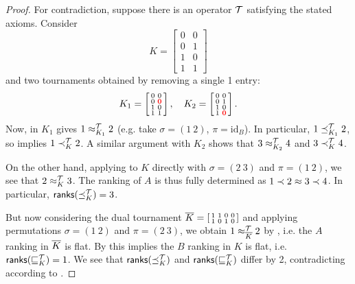 \begin{proof}

    For contradiction, suppose there is an operator $\mathcal{T}$ satisfying the
    stated axioms. Consider
    \[
        K = \left[\begin{smallmatrix}
            0 & 0 \\
            0 & 1 \\
            1 & 0 \\
            1 & 1
        \end{smallmatrix}\right]
    \]
    and two tournaments obtained by removing a single 1 entry:
    \[
        K_1 = \left[\begin{smallmatrix}
            0 & 0 \\
            0 & \bm{{\color{red}0}} \\
            1 & 0 \\
            1 & 1
        \end{smallmatrix}\right],
        \quad
        K_2 = \left[\begin{smallmatrix}
            0 & 0 \\
            0 & 1 \\
            1 & 0 \\
            1 & \bm{{\color{red}0}}
        \end{smallmatrix}\right].
    \]
    Now, \anon{} in $K_1$ gives $1 \approx_{K_1}^{\mathcal{T}} 2$ (e.g. take
    $\sigma = (1\ 2)$, $\pi = \text{id}_B$). In particular, $1 \preceq_{K_1}^{\mathcal{T}}
    2$, so \posresp{} implies $1 \prec_K^{\mathcal{T}} 2$. A similar argument
    with $K_2$ shows that $3 \approx_{K_2}^{\mathcal{T}} 4$ and $3 \prec_K^{\mathcal{T}} 4$.

    On the other hand, applying \anon{} to $K$ directly with $\sigma =
    (2\ 3)$ and $\pi = (1\ 2)$, we see that $2 \approx_K^{\mathcal{T}} 3$. The ranking of
    $A$ is thus fully determined as $1 \prec 2 \approx 3 \prec 4$. In particular,
    $\mathsf{ranks}({\preceq_K^{\mathcal{T}}}) = 3$.

    But now considering the dual tournament ${\overline{K}} =
    \left[\begin{smallmatrix} 1&1&0&0 \\ 1&0&1&0 \end{smallmatrix}\right]$ and
    applying permutations $\sigma = (1\ 2)$ and $\pi = (2\ 3)$, we obtain $1
    \approx_{{\overline{K}}}^{\mathcal{T}} 2$ by \anon{}, i.e. the $A$ ranking in
    ${\overline{K}}$ is flat. By \dualaxiom{} this implies the $B$ ranking in $K$
    is flat, i.e. $\mathsf{ranks}({\sqsubseteq_K^{\mathcal{T}}}) = 1$. We see that $\mathsf{ranks}({\preceq_K^{\mathcal{T}}})$
    and $\mathsf{ranks}({\sqsubseteq_K^{\mathcal{T}}})$ differ by 2, contradicting \chaindef{}
    according to .
\end{proof}

